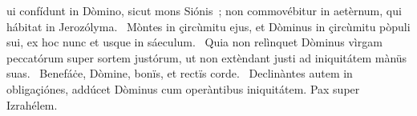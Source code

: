 \psalmChapterWithInscription{}
{ }
{%
ui confídunt in Dòmino, sicut mons Siónis~; non commovébitur in aetèrnum, qui hábitat in Jerozólyma. 
~Mòntes in çircùmitu ejus, et Dòminus in çircùmitu pòpuli sui, ex hoc nunc et usque in sáeculum. 
~Quia non relìnquet Dòminus vìrgam peccatórum super sortem justórum, ut non extèndant justi ad iniquitátem mànüs suas. 
~Benefáċe, Dòmine, bonïs, et rectïs corde. 
~Declinàntes autem in obligaçiónes, addúcet Dòminus cum operàntibus iniquitátem. Pax super Izrahélem. 
}
